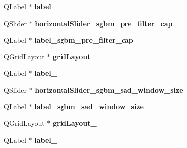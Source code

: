 \begin{DoxyCompactItemize}
\item 
\hypertarget{class_ui__stereo_match_param_form_a5815c64635568453493b4d5290c9f581}{}Q\+Label $\ast$ {\bfseries label\+\_}\label{class_ui__stereo_match_param_form_a5815c64635568453493b4d5290c9f581}

\item 
\hypertarget{class_ui__stereo_match_param_form_abebc59cc2661f7662665949913ab41b6}{}Q\+Slider $\ast$ {\bfseries horizontal\+Slider\+\_\+sgbm\+\_\+pre\+\_\+filter\+\_\+cap}\label{class_ui__stereo_match_param_form_abebc59cc2661f7662665949913ab41b6}

\item 
\hypertarget{class_ui__stereo_match_param_form_a9cbccad1275630d69ca8d6dc27bae9ee}{}Q\+Label $\ast$ {\bfseries label\+\_\+sgbm\+\_\+pre\+\_\+filter\+\_\+cap}\label{class_ui__stereo_match_param_form_a9cbccad1275630d69ca8d6dc27bae9ee}

\item 
\hypertarget{class_ui__stereo_match_param_form_aecc31d5429c169a9dda3d63bdab3f8cc}{}Q\+Grid\+Layout $\ast$ {\bfseries grid\+Layout\+\_}\label{class_ui__stereo_match_param_form_aecc31d5429c169a9dda3d63bdab3f8cc}

\item 
\hypertarget{class_ui__stereo_match_param_form_ac86149f27dbbe7b807063d1e42d5a47f}{}Q\+Label $\ast$ {\bfseries label\+\_}\label{class_ui__stereo_match_param_form_ac86149f27dbbe7b807063d1e42d5a47f}

\item 
\hypertarget{class_ui__stereo_match_param_form_a2034270b3a285edbc94519f86ab71e0f}{}Q\+Slider $\ast$ {\bfseries horizontal\+Slider\+\_\+sgbm\+\_\+sad\+\_\+window\+\_\+size}\label{class_ui__stereo_match_param_form_a2034270b3a285edbc94519f86ab71e0f}

\item 
\hypertarget{class_ui__stereo_match_param_form_ab21171704c44df90021e86e5ffc6640f}{}Q\+Label $\ast$ {\bfseries label\+\_\+sgbm\+\_\+sad\+\_\+window\+\_\+size}\label{class_ui__stereo_match_param_form_ab21171704c44df90021e86e5ffc6640f}

\item 
\hypertarget{class_ui__stereo_match_param_form_a1266646083de55945c5ce0383fa26da4}{}Q\+Grid\+Layout $\ast$ {\bfseries grid\+Layout\+\_}\label{class_ui__stereo_match_param_form_a1266646083de55945c5ce0383fa26da4}

\item 
\hypertarget{class_ui__stereo_match_param_form_a6523fa7a282cf47169c95c55ab7ad5f6}{}Q\+Label $\ast$ {\bfseries label\+\_}\label{class_ui__stereo_match_param_form_a6523fa7a282cf47169c95c55ab7ad5f6}


\end{DoxyCompactItemize}
